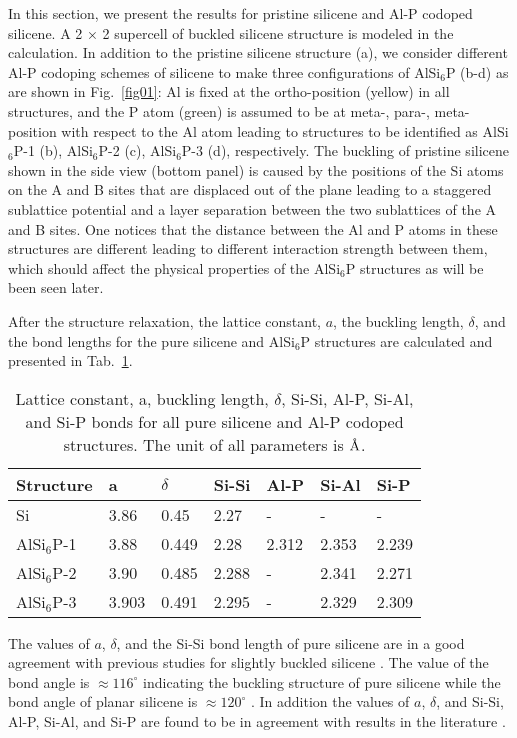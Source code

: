\documentclass[5p,twocolumn]{elsarticle}
\newcommand{\angstrom}{\text{\normalfont\AA}}
\def\fig#1{Fig.\ \ref{#1}}
\def\tab#1{Tab.\ \ref{#1}}
\begin{document}
In this section, we present the results for pristine silicene and Al-P codoped silicene. 
A 2 × 2 supercell of buckled silicene structure is modeled in the calculation.
In addition to the pristine silicene structure (a), we consider different Al-P codoping schemes of silicene to make three configurations of AlSi$_6$P (b-d) as are shown in \fig{fig01}: Al is fixed at the ortho-position (yellow) in all structures, and the P atom (green) is assumed to be at meta-, para-, meta-position with respect to the Al atom leading to structures to be identified as AlSi$_6$P-1 (b), AlSi$_6$P-2 (c), AlSi$_6$P-3 (d), respectively.
The buckling of pristine silicene shown in the side view (bottom panel) is caused by the positions of the Si atoms on the A and B sites that are displaced out of the plane leading to
a staggered sublattice potential and a layer separation between the two sublattices of the A and B sites.
One notices that the distance between the Al and P atoms in these structures are different leading to different interaction strength between them, which should affect the physical properties of the AlSi$_6$P structures as will be been seen later.

After the structure relaxation, the lattice constant, $a$, the buckling length, $\delta$, and the bond lengths for the pure silicene and AlSi$_6$P structures are calculated and presented in \tab{table_one}. 
%
\begin{table}[h]
	\centering
	\begin{center}
		\caption{\label{table_one} Lattice constant, a, buckling length, $\delta$, Si-Si, Al-P, Si-Al, and Si-P bonds for all pure silicene and Al-P codoped structures. The unit of all parameters is $\angstrom$.}
		\begin{tabular}{|l|l|l|l|l|l|l|}\hline
			Structure	  & a     & $\delta$& Si-Si & Al-P  & Si-Al & Si-P   \\ \hline
			Si	          & 3.86  &  0.45   & 2.27  & -     & -     & -       \\
			AlSi$_6$P-1	  & 3.88  &  0.449  & 2.28  & 2.312 & 2.353 & 2.239   \\
			AlSi$_6$P-2	  & 3.90  &  0.485  & 2.288 & -     & 2.341 & 2.271   \\
			AlSi$_6$P-3	  & 3.903 &  0.491  & 2.295 & -     & 2.329 & 2.309   \\ \hline
		\end{tabular}
	\end{center}
\end{table}
% 
The values of $a$, $\delta$, and the Si-Si bond length of pure silicene are in a good agreement with previous studies for slightly buckled silicene \cite{PhysRevLett.102.236804}. The value of the bond angle is $\approx 116^{\circ}$ indicating the buckling structure of pure silicene while the bond angle of planar silicene is $\approx 120^{\circ}$ \cite{C4RA04174G}. In addition the values of $a$, $\delta$, and Si-Si, Al-P, Si-Al, and Si-P are found to be in agreement with results in the literature \cite{C4RA07976K}.
\end{document}
